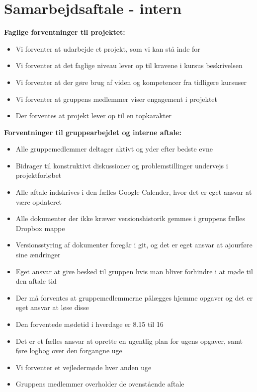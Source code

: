 \section*{Samarbejdsaftale - intern}

\textbf{Faglige forventninger til projektet:}
\begin{itemize}
	\item Vi forventer at udarbejde et projekt, som vi kan stå inde for
	\item Vi forventer at det faglige niveau lever op til kravene i kursus beskrivelsen
	\item Vi forventer at der gøre brug af viden og kompetencer fra tidligere kursuser
	\item Vi forventer at gruppens medlemmer viser engagement i projektet
	\item Der forventes at projekt lever op til en topkarakter
\end{itemize}

\textbf{Forventninger til gruppearbejdet og interne aftale:}
\begin{itemize}
	\item Alle gruppemedlemmer deltager aktivt og yder efter bedste evne
	\item Bidrager til konstruktivt diskussioner og problemstillinger undervejs i projektforløbet
	\item Alle aftale indskrives i den fælles Google Calender, hvor det er eget ansvar at være opdateret
	\item Alle dokumenter der ikke kræver versionshistorik gemmes i gruppens fælles Dropbox mappe
	\item Versionsstyring af dokumenter foregår i git, og det er eget ansvar at ajourføre sine ændringer
	\item Eget ansvar at give besked til gruppen hvis man bliver forhindre i at møde til den aftale tid
	\item Der må forventes at gruppemedlemmerne pålægges hjemme opgaver og det er eget ansvar at løse disse
	\item Den forventede mødetid i hverdage er 8.15 til 16
	\item Det er et fælles ansvar at oprette en ugentlig plan for ugens opgaver, samt føre logbog over den forgangne uge	
	\item Vi forventer et vejledermøde hver anden uge
	\item Gruppens medlemmer overholder de ovenstående aftale
\end{itemize}

